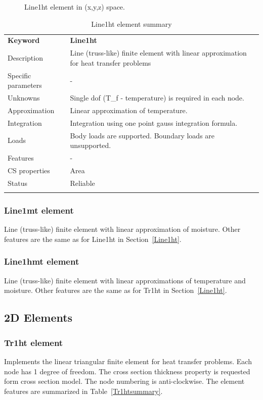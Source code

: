 \documentclass[a4paper]{article}
\newcommand{\param}[1]{\texttt{#1}} %
\newcommand{\templabel}{}%
\newcommand{\tempcaption}{}%
\newcounter{nelpar}
\newenvironment{elementsummary}[5]{%
  \gdef\tempcaption{#4}%
  \gdef\templabel{#5}%
  \setcounter{nelpar}{0}%
  \begin{center} %
    \begin{table}[!htb] %
      \begin{tabular}{|l|p{9cm}|}\hline %
        {\bf Keyword} & \bf{#1}\\ %
        {Description} & {#2}\\ %
        {Specific parameters} & {#3}\\ \hline %
}{
  \\ \hline %
      \end{tabular}%
      \caption{\tempcaption}%
      \label{\templabel}%
    \end{table}%
  \end{center}%
}
\newcommand{\elementParam}[1]{%
  \ifthenelse{\value{nelpar}>0} %
             {&{#1}}%
             {\setcounter{nelpar}{1}Parameters&{#1}}%
             \\%
}
\newcommand{\elementDescription}[2]{{#1} & {#2}\\}
\begin{document}
\begin{figure}[htb]
 \centering
 \begin{makeimage}
  
 \end{makeimage}
 \caption{Line1ht element in (x,y,z) space.}
\end{figure}

\begin{elementsummary}{Line1ht}{Line (truss-like) finite element with linear approximation for heat transfer problems}{-}{Line1ht element summary}{Line1htsummary}
\elementDescription{Unknowns}{Single dof (T\_f - temperature) is required in each node.}
\elementDescription{Approximation}{Linear approximation of temperature.}
\elementDescription{Integration}{Integration using one point gauss integration formula.}
\elementDescription{Loads}{Body loads are supported. Boundary loads are unsupported.}
\elementDescription{Features}{-}
\elementDescription{CS properties}{Area}
\elementDescription{Status}{Reliable}
\end{elementsummary}

\subsubsection{Line1mt element}
Line (truss-like) finite element with linear approximation of moisture.
Other features are the same as for Line1ht in Section~\ref{Line1ht}.

\subsubsection{Line1hmt element}
Line (truss-like) finite element with linear approximations of temperature and moisture. 
Other features are the same as for Tr1ht in Section~\ref{Line1ht}.




\subsection{2D Elements}
\subsubsection{Tr1ht element}
\label{Tr1ht}
Implements the linear triangular finite element for heat transfer problems. Each node has 1 degree of freedom.
The cross section thickness property is requested form cross section model.
The node numbering is anti-clockwise. The element features are summarized in Table~\ref{Tr1htsummary}.
\end{document}
